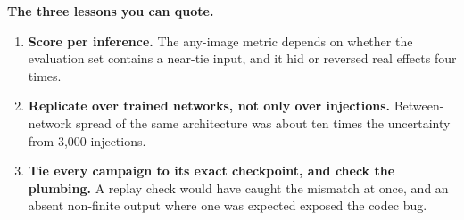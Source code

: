 \begin{keyidea}
\textbf{The three lessons you can quote.}
\begin{enumerate}
\item \textbf{Score per inference.} The any-image metric depends on whether the evaluation set contains a near-tie input, and it hid or reversed real effects four times.
\item \textbf{Replicate over trained networks, not only over injections.} Between-network spread of the same architecture was about ten times the uncertainty from 3{,}000 injections.
\item \textbf{Tie every campaign to its exact checkpoint, and check the plumbing.} A replay check would have caught the mismatch at once, and an absent non-finite output where one was expected exposed the codec bug.
\end{enumerate}
\end{keyidea}

